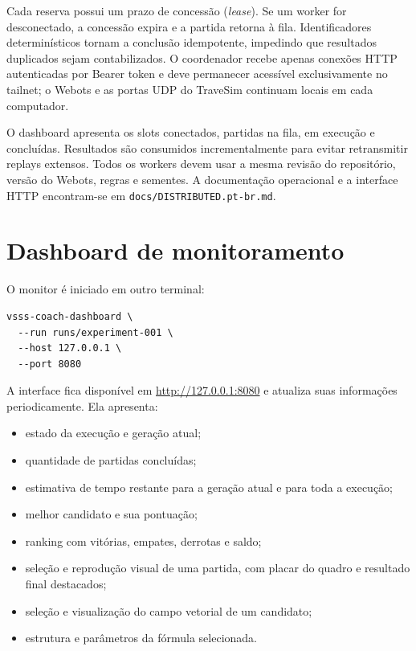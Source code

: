 \documentclass[12pt,a4paper]{article}
\begin{document}
Cada reserva possui um prazo de concess\~ao (\textit{lease}). Se um worker for desconectado, a concess\~ao expira e a partida retorna \`a fila. Identificadores determin\'isticos tornam a conclus\~ao idempotente, impedindo que resultados duplicados sejam contabilizados. O coordenador recebe apenas conex\~oes HTTP autenticadas por Bearer token e deve permanecer acess\'ivel exclusivamente no tailnet; o Webots e as portas UDP do TraveSim continuam locais em cada computador.

O dashboard apresenta os slots conectados, partidas na fila, em execu\c{c}\~ao e conclu\'idas. Resultados s\~ao consumidos incrementalmente para evitar retransmitir replays extensos. Todos os workers devem usar a mesma revis\~ao do reposit\'orio, vers\~ao do Webots, regras e sementes. A documenta\c{c}\~ao operacional e a interface HTTP encontram-se em \texttt{docs/DISTRIBUTED.pt-br.md}.

\section{Dashboard de monitoramento}

O monitor \'e iniciado em outro terminal:

\begin{verbatim}
vsss-coach-dashboard \
  --run runs/experiment-001 \
  --host 127.0.0.1 \
  --port 8080
\end{verbatim}

A interface fica dispon\'ivel em \url{http://127.0.0.1:8080} e atualiza suas informa\c{c}\~oes periodicamente. Ela apresenta:

\begin{itemize}
  \item estado da execu\c{c}\~ao e gera\c{c}\~ao atual;
  \item quantidade de partidas conclu\'idas;
  \item estimativa de tempo restante para a gera\c{c}\~ao atual e para toda a execu\c{c}\~ao;
  \item melhor candidato e sua pontua\c{c}\~ao;
  \item ranking com vit\'orias, empates, derrotas e saldo;
  \item sele\c{c}\~ao e reprodu\c{c}\~ao visual de uma partida, com placar do quadro e resultado final destacados;
  \item sele\c{c}\~ao e visualiza\c{c}\~ao do campo vetorial de um candidato;
  \item estrutura e par\^ametros da f\'ormula selecionada.
\end{itemize}
\end{document}
